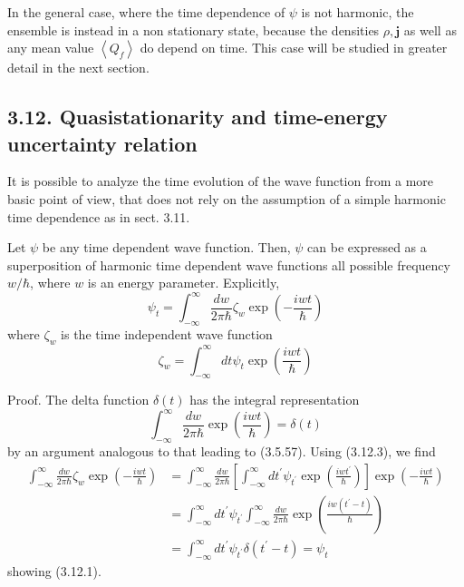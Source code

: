 \documentclass{article}
\begin{document}
In the general case, where the time dependence of $\psi$ is not harmonic, the ensemble is instead in a non stationary state, because the densities $\rho, \boldsymbol{j}$ as well
as any mean value $\left\langle Q_{f}\right\rangle$ do depend on time. This case will be studied in greater detail in the next section.

\subsection*{3.12. Quasistationarity and time-energy uncertainty relation}

It is possible to analyze the time evolution of the wave function from a more basic point of view, that does not rely on the assumption of a simple harmonic time dependence as in sect. 3.11.

Let $\psi$ be any time dependent wave function. Then, $\psi$ can be expressed as a superposition of harmonic time dependent wave functions all possible frequency $w / \hbar$, where $w$ is an energy parameter. Explicitly,
$$
\begin{equation*}
\psi_{t}=\int_{-\infty}^{\infty} \frac{d w}{2 \pi \hbar} \zeta_{w} \exp \left(-\frac{i w t}{\hbar}\right) \tag{3.12.1}
\end{equation*}
$$
where $\zeta_{w}$ is the time independent wave function
$$
\begin{equation*}
\zeta_{w}=\int_{-\infty}^{\infty} d t \psi_{t} \exp \left(\frac{i w t}{\hbar}\right) \tag{3.12.2}
\end{equation*}
$$

Proof. The delta function $\delta(t)$ has the integral representation
$$
\begin{equation*}
\int_{-\infty}^{\infty} \frac{d w}{2 \pi \hbar} \exp \left(\frac{i w t}{\hbar}\right)=\delta(t) \tag{3.12.3}
\end{equation*}
$$
by an argument analogous to that leading to (3.5.57). Using (3.12.3), we find
$$
\begin{align*}
\int_{-\infty}^{\infty} \frac{d w}{2 \pi \hbar} \zeta_{w} \exp \left(-\frac{i w t}{\hbar}\right) & =\int_{-\infty}^{\infty} \frac{d w}{2 \pi \hbar}\left[\int_{-\infty}^{\infty} d t^{\prime} \psi_{t^{\prime}} \exp \left(\frac{i w t^{\prime}}{\hbar}\right)\right] \exp \left(-\frac{i w t}{\hbar}\right) \\
& =\int_{-\infty}^{\infty} d t^{\prime} \psi_{t^{\prime}} \int_{-\infty}^{\infty} \frac{d w}{2 \pi \hbar} \exp \left(\frac{i w\left(t^{\prime}-t\right)}{\hbar}\right)  \tag{3.12.4}\\
& =\int_{-\infty}^{\infty} d t^{\prime} \psi_{t^{\prime}} \delta\left(t^{\prime}-t\right)=\psi_{t}
\end{align*}
$$
showing (3.12.1).
\end{document}
